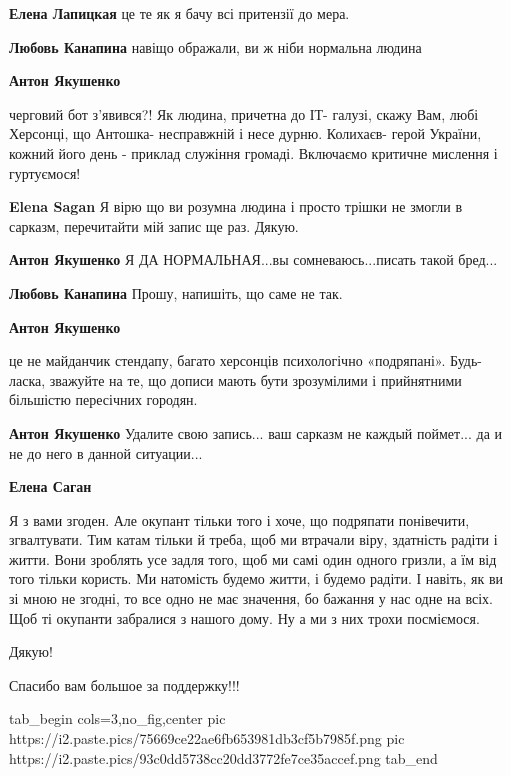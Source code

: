 \begin{itemize}
\begin{itemize}
\textbf{Елена Лапицкая} це те як я бачу всі притензії до мера.

\textbf{Любовь Канапина} навіщо ображали, ви ж ніби нормальна людина

\textbf{Антон Якушенко} 

черговий бот з'явився?! Як людина, причетна до ІТ- галузі, скажу Вам, любі
Херсонці, що Антошка- несправжній і несе дурню. Колихаєв- герой України, кожний
його день - приклад служіння громаді. Включаємо критичне мислення і гуртуємося!

\textbf{Elena Sagan} Я вірю що ви розумна людина і просто трішки не змогли в сарказм, перечитайти мій запис ще раз. Дякую.

\textbf{Антон Якушенко} Я ДА НОРМАЛЬНАЯ...вы сомневаюсь...писать такой бред...

\textbf{Любовь Канапина} Прошу, напишіть, що саме не так.

\textbf{Антон Якушенко} 

це не майданчик стендапу, багато херсонців психологічно «подряпані». Будь-
ласка, зважуйте на те, що дописи мають бути зрозумілими і прийнятними більшістю
пересічних городян.

\textbf{Антон Якушенко} Удалите свою запись... ваш сарказм не каждый поймет... да и не до него в данной ситуации...

\textbf{Елена Саган} 

Я з вами згоден. Але окупант тільки того і хоче, що подряпати понівечити,
згвалтувати. Тим катам тільки й треба, щоб ми втрачали віру, здатність радіти і
житти. Вони зроблять усе задля того, щоб ми самі один одного гризли, а їм від
того тільки користь. Ми натомість будемо житти, і будемо радіти. І навіть, як
ви зі мною не згодні, то все одно не має значення, бо бажання у нас одне на
всіх. Щоб ті окупанти забралися з нашого дому. Ну а ми з них трохи посміємося.

\end{itemize} %

Дякую!

Спасибо вам большое за поддержку!!!


\ifcmt
  tab_begin cols=3,no_fig,center
     pic https://i2.paste.pics/75669ce22ae6fb653981db3cf5b7985f.png
		 pic https://i2.paste.pics/93c0dd5738cc20dd3772fe7ce35accef.png
  tab_end
\fi


\end{itemize}
